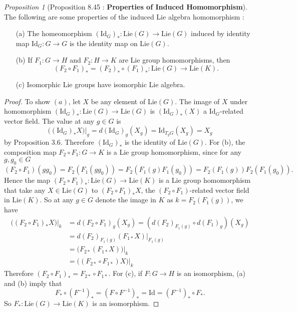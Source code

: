 \documentclass[a4paper]{article}
\theoremstyle{remark}
\newtheorem{prop}{Proposition}
\newcommand{\Id}{\text{Id}} %
\newcommand{\Lie}{\text{Lie}} %
\newcommand{\LieG}{\text{Lie}(G)} %
\begin{document}
\begin{prop}[Proposition 8.45 : \textbf{Properties of Induced Homomorphism}]
The following are some properties of the induced Lie algebra homomorphism :
\begin{enumerate}
\item[(a)] The homeomorphism $(\Id_G)_* : \LieG \to \LieG $ induced by identity map $\Id_G : G \to G$ is the identity map on Lie$(G)$. 
\item[(b)] If $F_1 : G \to H$ and $F_2 : H \to K$ are Lie group homomorphisms, then
$$
(F_2 \circ F_1)_* = (F_2)_* \circ (F_1)_* : \LieG \to \Lie(K).
$$
\item[(c)] Isomorphic Lie groups have isomorphic Lie algebra.
\end{enumerate}
\end{prop}
\begin{proof}
To show $(a)$, let $X$ be any element of $\LieG$. The image of $X$ under homomorphism $(\Id_G)_* : \LieG \to \LieG$ is $(\Id_G)_* (X)$ a $\Id_G$-related vector field. The value at any $g \in G$ is
$$
\big((\Id_G)_*X\big)|_g = d(\Id_G)_g(X_g) = \Id_{T_gG} (X_g) = X_g
$$
by Proposition 3.6. Therefore $(\Id_G)_*$ is the identity of $\LieG$. For (b), the composition map $F_2 \circ F_1 : G \to K$ is a Lie group homomorphism, since for any $g,g_0 \in G$
$$
(F_2 \circ F_1)(gg_0) = F_2(F_1(gg_0)) = F_2(F_1(g)F_1(g_0)) = F_2(F_1(g)) F_2(F_1(g_0)).
$$
Hence the map $(F_2 \circ F_1)_* : \LieG \to \Lie(K)$ is a Lie group homomorphism that take any $X \in \LieG$ to $(F_2 \circ F_1)_*X$, the $(F_2 \circ F_1)$-related vector field in $\Lie(K)$. So at any $g\in G$ denote the image in $K$ as $k=F_2(F_1(g))$, we have
\begin{align*}
\big((F_2 \circ F_1)_*X\big)|_k &= d(F_2\circ F_1)_g (X_g) = (d(F_2)_{F_1(g)} \circ d(F_1)_g)(X_g) \\
&= d(F_2)_{F_1(g)} (F_{1*}X)|_{F_1(g)}\\
&= \big(F_{2*} (F_{1*}X)\big)|_{k}\\
&= \big( (F_{2*} \circ F_{1*})X \big)|_k
\end{align*}
Therefore $(F_2 \circ F_1)_* = F_{2*} \circ F_{1*}$. 
For (c), if $F : G \to H$ is an isomorphism, (a) and (b) imply that
$$
F_* \circ (F^{-1})_* = (F\circ F^{-1})_* = \Id = (F^{-1})_* \circ F_*.
$$
So $F_* : \LieG \to \Lie(K)$ is an isomorphism.
\end{proof}
\end{document}
